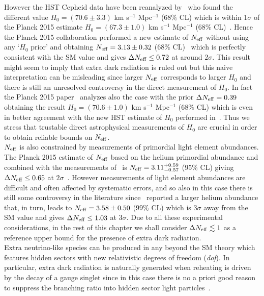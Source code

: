 \documentclass[12pt,a4paper]{book}
\begin{document}
However the HST Cepheid data have been reanalyzed by~\cite{Efstathiou:2013via} who found the different value $H_0 = (70.6\pm 3.3)$ km s$^{-1}$ Mpc$^{-1}$ ($68\%$ CL) which is within $1\sigma$ of the Planck 2015 estimate $H_0 = (67.3\pm 1.0)$ km s$^{-1}$ Mpc$^{-1}$ ($68\%$ CL)~\cite{Ade:2015xua}. Hence the Planck 2015 collaboration performed a new estimate of $N_{\rm eff}$ without using any `$H_0$ prior' and obtaining $N_{\rm eff} = 3.13 \pm 0.32$ ($68\%$ CL)~\cite{Ade:2013zuv} which is perfectly consistent with the SM value and gives $\Delta N_{\rm eff} \leq 0.72$ at around $2\sigma$. This result might seem to imply that extra dark radiation is ruled out but this naive interpretation can be misleading since larger $N_{\rm eff}$ corresponds to larger $H_0$ and there is still an unresolved controversy in the direct measurement of $H_0$. In fact the Planck 2015 paper~\cite{Ade:2015xua} analyzes also the case with the prior $\Delta N_{\rm eff}=0.39$ obtaining the result $H_0 = (70.6\pm 1.0)$ km s$^{-1}$ Mpc$^{-1}$ ($68\%$ CL) which is even in better agreement with the new HST estimate of $H_0$ performed in~\cite{Efstathiou:2013via}. Thus we stress that trustable direct astrophysical measurements of $H_0$ are crucial in order to obtain reliable bounds on $N_{\rm eff}$.\\

$N_{\rm eff}$ is also constrained by measurements of primordial light element abundances. The Planck 2015 estimate of $N_{\rm eff}$ based on the helium primordial abundance and combined with the measurements of~\cite{Aver:2013wba} is $N_{\rm eff}= 3.11^{+0.59}_{-0.57}$ ($95\%$ CL) giving $\Delta N_{\rm eff} \leq 0.65$ at $2\sigma$~\cite{Ade:2015xua}. However measurements of light element abundances are difficult and often affected by systematic errors, and so also in this case there is still some controversy in the literature since~\cite{Izotov:2014fga} reported a larger helium abundance that, in turn, leads to $N_{\rm eff}= 3.58 \pm 0.50$ ($99\%$ CL) which is $3\sigma$ away from the SM value and gives $\Delta N_{\rm eff} \leq 1.03$ at $3\sigma$. Due to all these experimental considerations, in the rest of this chapter we shall consider $\Delta N_{\rm eff}\lesssim 1$ as a reference upper bound for the presence of extra dark radiation.\\

Extra neutrino-like species can be produced in any beyond the SM theory which features hidden sectors with new relativistic degrees of freedom (\textit{dof}). In particular, extra dark radiation is naturally generated when reheating is driven by the decay of a gauge singlet since in this case there is no a priori good reason to suppress the branching ratio into hidden sector light particles~\cite{Cicoli:2012aq, Higaki:2012ar, Higaki:2013lra}. \\
\end{document}
